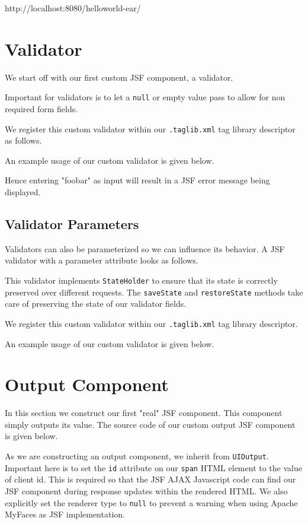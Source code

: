 http://localhost:8080/helloworld-ear/

\section{Validator}
\label{sec:validator}
We start off with our first custom JSF component, a validator.

Important for validators is to let a \texttt{null} or empty value pass to allow for non required form fields.

We register this custom validator within our \texttt{.taglib.xml} tag library descriptor as follows.


An example usage of our custom validator is given below.

Hence entering "foobar" as input will result in a JSF error message being displayed.


\subsection{Validator Parameters}
Validators can also be parameterized so we can influence its behavior. 
A JSF  validator with a parameter attribute looks as follows.

This validator implements \texttt{StateHolder} to ensure that its state is correctly preserved over different requests.
The \texttt{saveState} and \texttt{restoreState} methods take care of preserving the state of our validator fields.

We register this custom validator within our \texttt{.taglib.xml} tag library descriptor.


An example usage of our custom validator is given below.


\section{Output Component}
In this section we construct our first "real" JSF component.
This component simply outputs its value.
The source code of our custom output JSF component is given below.

As we are constructing an output component, we inherit from \texttt{UIOutput}.
Important here is to set the \texttt{id} attribute on our \texttt{span} HTML element to the value of client id.
This is required so that the JSF AJAX Javascript code can find our JSF component during response updates within the rendered HTML.
We also explicitly set the renderer type to \texttt{null} to prevent a warning when using Apache MyFaces \cite{myfaces} as JSF implementation.

